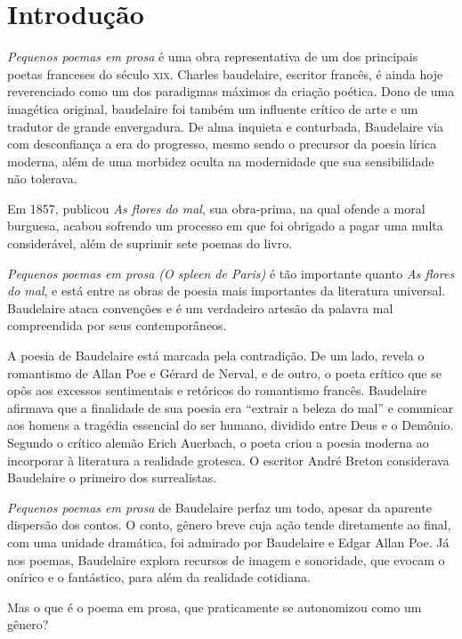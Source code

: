 \documentclass[12pt]{extarticle}
\begin{document}
\tableofcontents

\section{Introdução}

\textit{Pequenos poemas em prosa}
é uma obra representativa de um dos principais poetas franceses do
século \textsc{xix}. Charles baudelaire, escritor francês, é ainda hoje reverenciado como um dos
paradigmas máximos da criação poética. Dono de uma imagética original,
baudelaire foi também um influente crítico de
arte e um tradutor de grande envergadura. De alma inquieta e conturbada, 
Baudelaire via com desconfiança a era do
progresso, mesmo sendo o precursor da poesia lírica moderna, 
além de uma morbidez oculta na modernidade que sua sensibilidade não tolerava.
 
Em 1857, publicou \textit{As flores do mal}, sua
obra-prima, na qual ofende a moral burguesa, acabou sofrendo um processo em
que foi obrigado a pagar uma multa considerável, além de suprimir sete poemas
do livro. 

\textit{Pequenos poemas em prosa (O spleen de Paris)} é tão importante quanto 
\textit{As flores do mal}, e está entre as obras de poesia mais importantes da 
literatura universal. Baudelaire ataca convenções e é um verdadeiro artesão 
da palavra mal compreendida por seus contemporâneos. 

A poesia de Baudelaire está marcada pela
contradição. De um lado, revela o romantismo de Allan Poe e Gérard de Nerval, e
de outro, o poeta crítico que se opôs aos excessos sentimentais e retóricos do
romantismo francês.
Baudelaire afirmava que a finalidade de sua poesia era “extrair a beleza do
mal” e comunicar aos homens a tragédia essencial do ser humano, dividido entre
Deus e o Demônio.  Segundo o crítico alemão Erich Auerbach, o poeta criou a
poesia moderna ao incorporar à literatura a realidade grotesca. O escritor
André Breton considerava Baudelaire o primeiro dos surrealistas.
 
\textit{Pequenos poemas em prosa} de Baudelaire perfaz um todo, 
apesar da aparente dispersão dos contos. O conto, gênero breve cuja 
ação tende diretamente ao final, com uma unidade
dramática, foi admirado por Baudelaire e Edgar Allan Poe.
Já nos poemas, Baudelaire explora recursos de imagem e sonoridade, que evocam o
onírico e o fantástico, para além da realidade cotidiana.

Mas o que é o poema em prosa, que praticamente se autonomizou como um
gênero?
 
\end{document}
